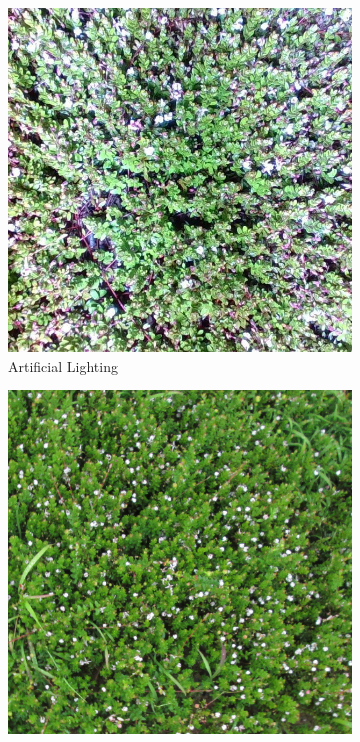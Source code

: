 \begin{figure}[!ht]
\begin{subfigure}{0.3\textwidth}
    \includegraphics[width=\textwidth]{images/Artficial-Light_7-119.JPG}
   \caption{Artificial Lighting}
    \label{fig:ArtficialLight}
  \end{subfigure}
  \hfill
  \begin{subfigure}[b]{0.3\textwidth}
    \includegraphics[width=\textwidth]{images/Nat_light_7-119.JPG}

\end{subfigure}
\end{figure}

